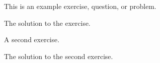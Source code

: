 \begin{exercise}
    This is an example exercise, question, or problem.
\end{exercise}

\begin{solution}
    The solution to the exercise.
\end{solution}


\begin{exercise}
    A second exercise.
\end{exercise}

\begin{solution}
    The solution to the second exercise.
\end{solution}
